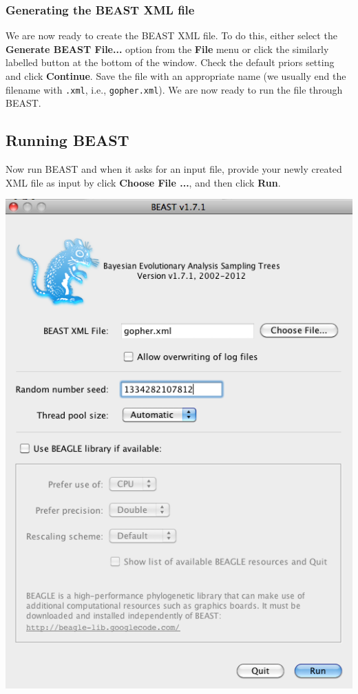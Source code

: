 \documentclass[12pt]{article}
\begin{document}
\subsubsection*{Generating the BEAST XML file }

We are now ready to create the BEAST XML file. To do this,
either select the {\bf Generate BEAST File...} option from the \textbf{File} menu or click the similarly labelled button at the bottom of the window. Check the default priors setting and click \textbf{Continue}. Save the file with an appropriate name
(we usually end the filename with \texttt{.xml}, i.e., \texttt{gopher.xml}).
We are now ready to run the file through BEAST. 

\subsection*{Running BEAST }

Now run BEAST and when it asks for an input file, provide your newly
created XML file as input by click \textbf{Choose File ...}, and then click \textbf{Run}. 

\medskip{}

\includegraphics[scale=0.5]{figures/BEAST}
\end{document}
